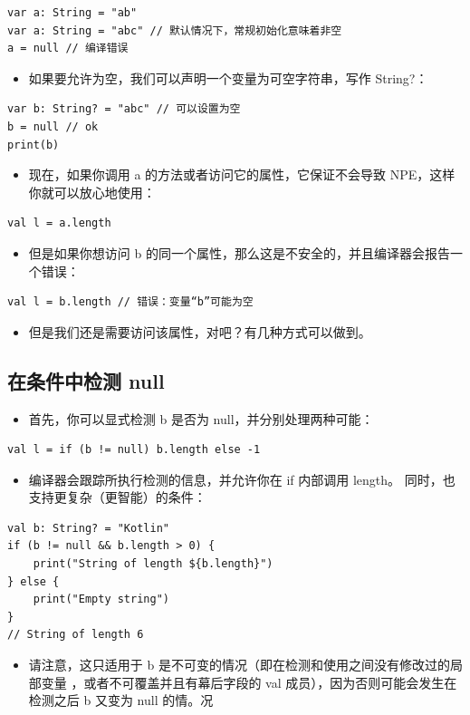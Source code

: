 \documentclass[9pt, b5paper]{article}
\begin{document}
\begin{verbatim}
var a: String = "ab"
var a: String = "abc" // 默认情况下，常规初始化意味着非空
a = null // 编译错误
\end{verbatim}
\begin{itemize}
\item 如果要允许为空，我们可以声明一个变量为可空字符串，写作 String?：
\end{itemize}
\begin{verbatim}
var b: String? = "abc" // 可以设置为空
b = null // ok
print(b)
\end{verbatim}
\begin{itemize}
\item 现在，如果你调用 a 的方法或者访问它的属性，它保证不会导致 NPE，这样你就可以放心地使用：
\end{itemize}
\begin{verbatim}
val l = a.length
\end{verbatim}
\begin{itemize}
\item 但是如果你想访问 b 的同一个属性，那么这是不安全的，并且编译器会报告一个错误：
\end{itemize}
\begin{verbatim}
val l = b.length // 错误：变量“b”可能为空
\end{verbatim}
\begin{itemize}
\item 但是我们还是需要访问该属性，对吧？有几种方式可以做到。
\end{itemize}

\subsection{在条件中检测 null}
\label{sec-1-2}
\begin{itemize}
\item 首先，你可以显式检测 b 是否为 null，并分别处理两种可能：
\end{itemize}
\begin{verbatim}
val l = if (b != null) b.length else -1
\end{verbatim}
\begin{itemize}
\item 编译器会跟踪所执行检测的信息，并允许你在 if 内部调用 length。 同时，也支持更复杂（更智能）的条件：
\end{itemize}
\begin{verbatim}
val b: String? = "Kotlin"
if (b != null && b.length > 0) {
    print("String of length ${b.length}")
} else {
    print("Empty string")
}
// String of length 6
\end{verbatim}
\begin{itemize}
\item 请注意，这只适用于 b 是不可变的情况（即在检测和使用之间没有修改过的局部变量 ，或者不可覆盖并且有幕后字段的 val 成员），因为否则可能会发生在检测之后 b 又变为 null 的情。况
\end{itemize}
\end{document}

